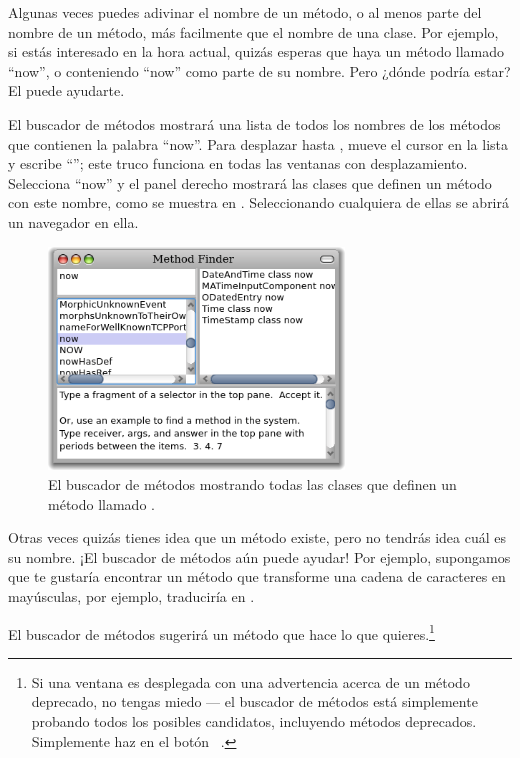 \documentclass[a4paper,10pt,twoside]{book}
\begin{document}
Algunas veces puedes adivinar el nombre de un m\'etodo, o al menos parte del nombre de un m\'etodo, m\'as facilmente que el nombre de una clase. Por ejemplo, si est\'as interesado en la hora actual, quiz\'as esperas que haya un m\'etodo llamado ``now'', o conteniendo ``now'' como parte de su nombre. Pero ¿d\'onde podr\'ia estar?
El  puede ayudarte.

El buscador de m\'etodos mostrar\'a una lista de todos los nombres de los m\'etodos que contienen la palabra ``now''.
Para desplazar hasta , mueve el cursor en la lista y escribe ``''; este truco funciona en todas las ventanas con desplazamiento. Selecciona ``now'' y el panel derecho mostrar\'a las clases que definen un m\'etodo con este nombre, como se muestra en . Seleccionando cualquiera de ellas se abrir\'a un navegador en ella.

\begin{figure}[hbt]
\centerline {\includegraphics[width=0.7\textwidth]{methodFinder-now}}
\caption{El buscador de m\'etodos mostrando todas las clases que definen un m\'etodo llamado .
}
\end{figure}

Otras veces quiz\'as tienes idea que un m\'etodo existe, pero no tendr\'as idea cu\'al es su nombre.
¡El buscador de m\'etodos a\'un puede ayudar! Por ejemplo, supongamos que te gustar\'ia encontrar un m\'etodo que transforme una cadena de caracteres en may\'usculas, por ejemplo, traducir\'ia  en .

\noindent
El buscador de m\'etodos sugerir\'a un m\'etodo que hace lo que quieres.\footnote{Si una ventana es desplegada con una advertencia acerca de un m\'etodo deprecado, no tengas miedo --- el buscador de m\'etodos est\'a simplemente probando todos los posibles candidatos, incluyendo m\'etodos deprecados. Simplemente haz \click en el bot\'on ~.}
\end{document}
